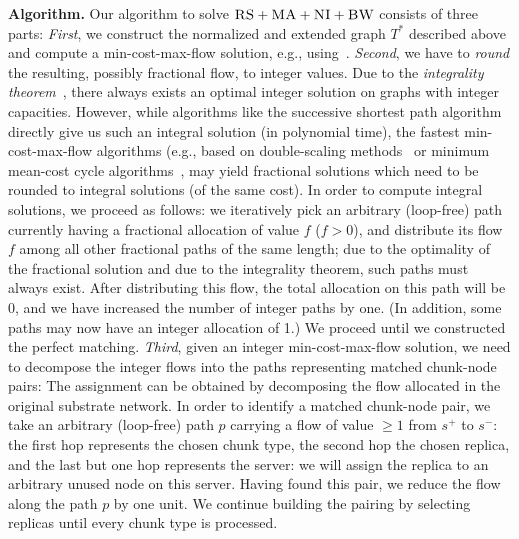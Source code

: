 \documentclass[9pt]{sigcomm-alternate}
\newcommand{\Source}{\ensuremath{s^{+}}}
\newcommand{\Sink}{\ensuremath{s^{-}}}
\newcommand{\CC}{\textsc{NI}}
\newcommand{\RS}{\textsc{RS}}
\newcommand{\BW}{\textsc{BW}}
\newcommand{\MA}{\textsc{MA}}
\newcommand{\Tree}{\ensuremath{T}}
\begin{document}
\textbf{Algorithm.}
Our algorithm to solve $\RS+\MA+\CC+\BW$ consists of three parts:
\emph{First}, we construct the normalized and extended graph $\Tree^*$
described above and compute
a min-cost-max-flow solution, e.g.,
using~\cite{mincostmaxflow-1,mincostmaxflow-2}.
\emph{Second}, we have to \emph{round} the resulting, possibly fractional flow, to
integer values. Due to the \emph{integrality theorem}~\cite{flow-book},
there always exists an optimal integer solution on graphs with integer capacities.
However, while algorithms like the successive shortest path algorithm~\cite{successive_shortest_path_complexity}
directly give us such an integral solution (in polynomial time), the fastest min-cost-max-flow algorithms (e.g., based on double-scaling
methods~\cite{mincostmaxflow-1} or minimum mean-cost cycle
algorithms~\cite{mincostmaxflow-2}, may yield fractional solutions
which need to be rounded to integral solutions (of the same cost).
In order to compute integral solutions, we proceed as follows: we iteratively
pick an arbitrary (loop-free) path
currently having a fractional allocation of value $f$ ($f>0$), and distribute its flow $f$
among all other fractional paths of the same length; due to the optimality of the fractional solution
and due to the integrality theorem, such paths must always exist. After distributing this flow,
the total allocation on this path will be 0, and we have increased the number of integer paths by one.
(In addition, some paths may now have an integer allocation of 1.) We proceed until we constructed the perfect matching.
\emph{Third}, given an integer min-cost-max-flow solution, we need to decompose the integer flows into the paths
representing matched chunk-node pairs:
The assignment can be obtained by decomposing the flow allocated in the
original substrate network. In order to identify a matched chunk-node pair,
we take an arbitrary (loop-free) path $p$ carrying a flow of value  $\geq 1$ from $\Source$ to $\Sink$:
the first hop represents the chosen chunk type, the second hop the chosen
replica, and the last but one hop represents the server: we will assign
the replica to an arbitrary unused node on this server.
Having found this pair, we reduce the flow
along the path $p$ by one unit.
We continue building the pairing by selecting replicas until every chunk type is processed.
\end{document}
